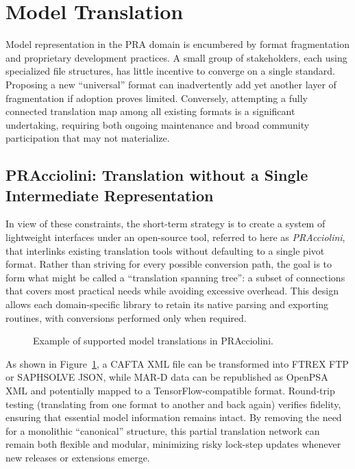 \section{Model Translation}
Model representation in the PRA domain is encumbered by format fragmentation and proprietary development practices. A small group of stakeholders, each using specialized file structures, has little incentive to converge on a single standard. Proposing a new “universal” format can inadvertently add yet another layer of fragmentation if adoption proves limited. Conversely, attempting a fully connected translation map among all existing formats is a significant undertaking, requiring both ongoing maintenance and broad community participation that may not materialize.

\subsection{PRAcciolini: Translation without a Single Intermediate Representation}
In view of these constraints, the short-term strategy is to create a system of lightweight interfaces under an open-source tool, referred to here as \emph{PRAcciolini}, that interlinks existing translation tools without defaulting to a single pivot format. Rather than striving for every possible conversion path, the goal is to form what might be called a “translation spanning tree”: a subset of connections that covers most practical needs while avoiding excessive overhead. This design allows each domain-specific library to retain its native parsing and exporting routines, with conversions performed only when required.

\begin{figure}[h!]
  
    \caption{Example of supported model translations in PRAcciolini.}
  \label{fig:translations}
\end{figure}

As shown in Figure~\ref{fig:translations}, a CAFTA XML file can be transformed into FTREX FTP or SAPHSOLVE JSON, while MAR-D data can be republished as OpenPSA XML and potentially mapped to a TensorFlow-compatible format. Round-trip testing (translating from one format to another and back again) verifies fidelity, ensuring that essential model information remains intact. By removing the need for a monolithic “canonical” structure, this partial translation network can remain both flexible and modular, minimizing risky lock-step updates whenever new releases or extensions emerge.


